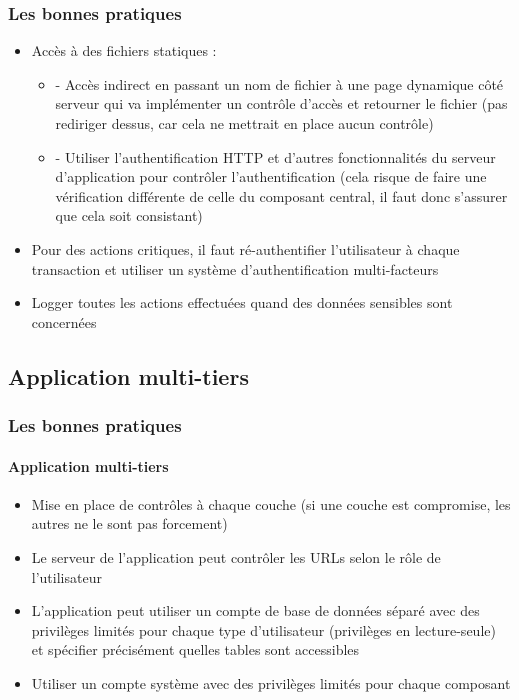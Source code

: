 \documentclass[aspectratio=169]{beamer}  %
\begin{document}
\begin{frame}
  \frametitle{Les bonnes pratiques}
  \begin{exampleblock}{}
    \begin{itemize}
      \item Accès à des fichiers statiques : 
      \begin{itemize}
        \item - Accès indirect en passant un nom de fichier à une page dynamique côté serveur qui va implémenter un contrôle d'accès et retourner le fichier (pas rediriger dessus, car cela ne mettrait en place aucun contrôle)
        \item - Utiliser l'authentification HTTP et d'autres fonctionnalités du serveur d'application pour contrôler l'authentification (cela risque de faire une vérification différente de celle du composant central, il faut donc s'assurer que cela soit consistant)
      \end{itemize}
    \end{itemize}
  \end{exampleblock}
  \pause
  \begin{alertblock}{}
    \begin{itemize}
      \item Pour des actions critiques, il faut ré-authentifier l'utilisateur à chaque transaction et utiliser un système d'authentification multi-facteurs
    \end{itemize}
  \end{alertblock}
  \pause
  \begin{exampleblock}{}
    \begin{itemize}
      \item Logger toutes les actions effectuées quand des données sensibles sont concernées
    \end{itemize}
  \end{exampleblock}
\end{frame}

\subsection{Application multi-tiers}
\begin{frame}
  \frametitle{Les bonnes pratiques}
  \framesubtitle{Application multi-tiers}
  \begin{exampleblock}{}
    \begin{itemize}
      \item Mise en place de contrôles à chaque couche (si une couche est compromise, les autres ne le sont pas forcement)
      \item Le serveur de l'application peut contrôler les URLs selon le rôle de l'utilisateur
      \item L'application peut utiliser un compte de base de données séparé avec des privilèges limités pour chaque type d'utilisateur (privilèges en lecture-seule) et spécifier précisément quelles tables sont accessibles
      \item Utiliser un compte système avec des privilèges limités pour chaque composant
    \end{itemize}
  \end{exampleblock}
\end{frame}
\end{document}
